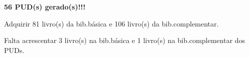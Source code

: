 \documentclass[12pt,a4paper]{book}
\begin{document}
\newpage

\newpage

\newpage

\newpage

\newpage

\newpage

\newpage

\newpage

\newpage

%
\newpage

\newpage

\newpage

\newpage

\newpage

 
 

\textbf{56 PUD(s) gerado(s)!!!}\label{RELATORIO}

 Adquirir 81 livro(s) da bib.básica e 106 livro(s) da bib.complementar.

 Falta acrescentar 3 livro(s) na bib.básica e 1 livro(s) na bib.complementar dos PUDs.
\end{document}
